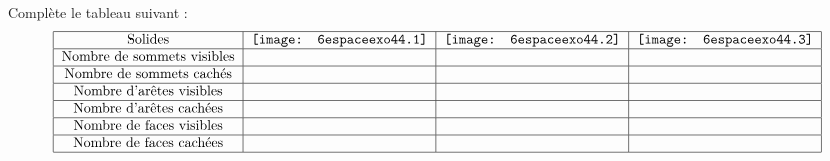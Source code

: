 Complète le tableau suivant :
\renewcommand{\arraystretch}{1.5}
\[\begin{tabular}{|c|c|c|c|}
  \hline Solides & \texttt{[image: 6espaceexo44.1]}
                & \texttt{[image: 6espaceexo44.2]}
                & \texttt{[image: 6espaceexo44.3]} \\
  \hline Nombre de sommets visibles & & & \\
  \hline Nombre de sommets cachés & & & \\  
  \hline Nombre d'arêtes visibles & & & \\
  \hline Nombre d'arêtes cachées & & & \\  
  \hline Nombre de faces visibles & & & \\
  \hline Nombre de faces cachées & & & \\  
  \hline  
\end{tabular}\]
\renewcommand{\arraystretch}{1}